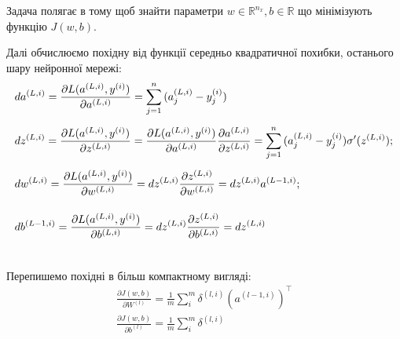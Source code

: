 \documentclass[14pt,a4paper]{extarticle}
\newcounter{e}
\numberwithin{equation}{section}
\numberwithin{figure}{section}
\newcommand{\ith}{^{(i)}}
\begin{document}
	Задача полягає в тому щоб знайти параметри $w \in \mathbb{R}^{n_x}, b\in \mathbb{R}$ що мінімізують функцію $J(w, b)$.

	
	Далі обчислюємо похідну від функції середньо квадратичної похибки, останього шару нейронної мережі:
	\begin{equation*}
		\begin{array}{l}
			\displaystyle
			da^{(L, i)}
			=
			\pdv{L(a^{(L, i)}, y\ith)}{a^{(L, i)}}
			=
			\sum_{j=1}^{n}{(a^{(L, i)}_j - y\ith_j)}
			\\[0.7cm]

			\displaystyle
			dz^{(L, i)}
			=
			\pdv{L(a^{(L, i)}, y\ith)}{z^{(L, i)}}
			= 
			\pdv{L(a^{(L, i)}, y\ith)}{a^{(L, i)}} \pdv{a^{(L, i)}}{z^{(L, i)}}
			=
			\sum_{j=1}^{n}{(a^{(L, i)}_j - y\ith_j)} \sigma^{\prime}(z^{(L, i)});
			\\[0.7cm]

			\displaystyle
			dw^{(L, i)} 
			=
			\pdv{L(a^{(L, i)}, y\ith)}{w^{(L, i)}}
			=
			dz^{(L, i)} \pdv{z^{(L, i)}}{w^{(L, i)}}
			=
			dz^{(L, i)} a^{(L-1, i)};
			\\[0.7cm]
	
			\displaystyle
			db^{(L - 1, i)}
			=
			\pdv{L(a^{(L, i)}, y\ith)}{b^{(L, i)}}
			=
			dz^{(L, i)} \pdv{z^{(L, i)}}{b^{(L, i)}} 
			= 
			dz^{(L, i)}
			\\[0.7cm]
		\end{array}
	\end{equation*}

	


	\begin{comment}
			\displaystyle
			\pdv{a^{(L, i)}}{z^{(L, i)}}
			=
			\sigma^{\prime}(z^{(L, i)});
			\quad
			\pdv{z^{(L, i)}}{w^{(L-1, i)}}
			=
			a^{(L-1, i)};
			\quad
			\pdv{z^{(L, i)}}{b^{(L, i)}}
			=
			1;
	\end{comment}

	Перепишемо похідні в більш компактному вигляді:
	\begin{equation*}
		\begin{array}{l}
			\displaystyle
			\frac{\partial J(w, b)}{\partial W^{(l)}} =\frac{1}{m} \sum_{i}^{m} 	\delta^{(l, i)}\left(a^{(l-1, i)}\right)^{\top}
			\\[0.7cm]
	
			\displaystyle
			 \frac{\partial J(w, b)}{\partial b^{(l)}} =\frac{1}{m} \sum_{i}^{m} \delta^{(l, i)}
		\end{array}
	\end{equation*}
\end{document}
